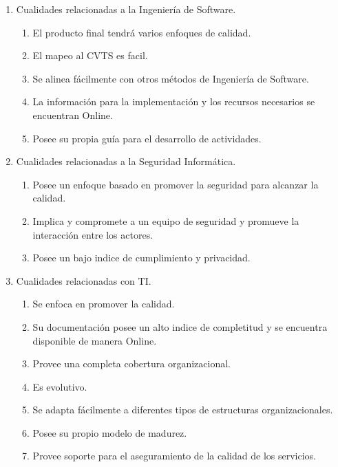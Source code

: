 \documentclass[runningheads,a4paper]{llncs}
\begin{document}
\begin{enumerate}
	\item Cualidades relacionadas a la Ingeniería de \gls{Software}.
		\begin{enumerate}
			\item El producto final tendrá varios enfoques de calidad.
			\item El mapeo al \gls{CVTS} es facil.
			\item Se alinea fácilmente con otros métodos de Ingeniería de \gls{Software}.
			\item La información para la implementación y los recursos necesarios se encuentran \gls{Online}.
			\item Posee su propia guía para el desarrollo de actividades.\\
			
		\end{enumerate}
	\item Cualidades relacionadas a la Seguridad Informática.
		\begin{enumerate}
			\item Posee un enfoque basado en promover la seguridad para alcanzar la calidad.
			\item Implica y compromete a un equipo de seguridad y promueve la interacción entre los actores.
			\item Posee un bajo indice de cumplimiento y privacidad.\\
			
		\end{enumerate}
	\item Cualidades relacionadas con \gls{TI}.
		\begin{enumerate}
			\item Se enfoca en promover la calidad.
			\item Su documentación posee un alto indice de completitud y se encuentra disponible de manera \gls{Online}.
			\item Provee una completa cobertura organizacional.
			\item Es evolutivo.
			\item Se adapta fácilmente a diferentes tipos de estructuras organizacionales.
			\item Posee su propio modelo de madurez.
			\item Provee soporte para el aseguramiento de la calidad de los servicios.\\
		\end{enumerate}
\end{enumerate}
\end{document}
